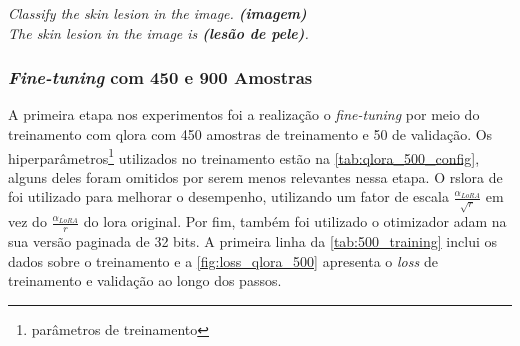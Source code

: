 \begin{dialogue}
     \textit{Classify the skin lesion in the image. \textbf{(imagem)}} \\
     \textit{The skin lesion in the image is \textbf{(lesão de pele)}.}
\end{dialogue}

\subsubsection{\textit{Fine-tuning} com 450 e 900 Amostras}

A primeira etapa nos experimentos foi a realização o \textit{fine-tuning} por meio do treinamento com \ac{qlora} com
450 amostras de treinamento e 50 de validação. Os hiperparâmetros\footnote{parâmetros de treinamento} utilizados no
treinamento estão na \autoref{tab:qlora_500_config}, alguns deles foram omitidos por serem menos relevantes nessa
etapa. O \ac{rslora} de \textcite{kalajdzievski2023rank} foi utilizado para melhorar o desempenho, utilizando um fator
de escala \begin{math}\frac{\alpha_{LoRA}}{\sqrt{r}}\end{math} em vez do \begin{math}\frac{\alpha_{LoRA}}{r}\end{math}
do \ac{lora} original. Por fim, também foi utilizado o otimizador \ac{adam} na sua versão paginada de 32 bits. A
primeira linha da \autoref{tab:500_training} inclui os dados sobre o treinamento e a \autoref{fig:loss_qlora_500}
apresenta o \textit{loss} de treinamento e validação ao longo dos passos.

